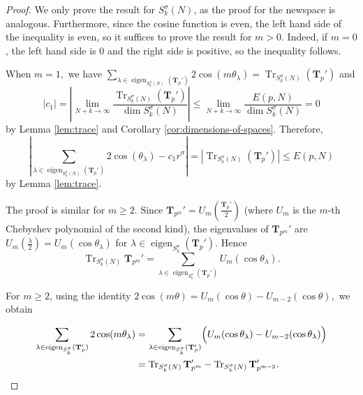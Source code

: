 \documentclass[11pt,letterpaper,reqno]{amsart}
\theoremstyle{definition}
\numberwithin{equation}{section}
\numberwithin{figure}{section}
\numberwithin{table}{section}
\newcommand{\eigen}{\operatorname{eigen}}
\begin{document}
\begin{proof}
    We only prove the result for $S_k^\sigma(N)$, as the proof for the newspace is analogous. Furthermore, since the cosine function is even, the left hand side of the inequality is even, so it suffices to prove the result for $m > 0$. Indeed, if $m = 0$, the left hand side is $0$ and the right side is positive, so the inequality follows.

    When $m = 1,$ we have $\sum_{\lambda \in \eigen_{S_k^\sigma(N)}(\mathbf{T}_p')} 2\cos(m\theta_\lambda) = \operatorname{Tr}_{S_k^\sigma(N)}(\mathbf{T}_p')$ and
    $$|c_1| = \left| \lim_{N + k \rightarrow \infty} \frac{\operatorname{Tr}_{S_k^\sigma(N)}(\mathbf{T}_p')}{\dim S_k^\sigma(N)}  \right| \leq \lim_{N + k \rightarrow \infty} \frac{E(p, N)}{\dim S_k^\sigma(N)} = 0$$
    by Lemma \ref{lem:trace} and Corollary \ref{cor:dimensions-of-spaces}. Therefore,
    $$\left| \sum_{\lambda \in \eigen_{S_k^\sigma(N)}(\mathbf{T}_p')} 2\cos(\theta_\lambda) - c_1 r^\sigma \right| = \left| \operatorname{Tr}_{S_k^\sigma(N)}(\mathbf{T}_p')  \right| \leq E(p, N)$$
    by Lemma \ref{lem:trace}.

    The proof is similar for $m \geq 2.$ Since \(\mathbf{T}_{p^m}' =  U_m\left(\frac{\mathbf{T}_p'}{2} \right)\) \cite[Theorem 10.2.9]{cohen2017modular} (where $U_m$ is the $m$-th Chebyshev polynomial of the second kind), 
the eigenvalues of $\mathbf{T}_{p^m}'$ are
\(
U_m\left( \frac{\lambda}{2}\right) = U_m(\cos\theta_\lambda)\) for \(\lambda \in 
\operatorname{eigen}_{S_k^{\sigma}}(\mathbf{T}_p')\).
Hence
\[
\operatorname{Tr}_{S_k^{\sigma}(N)} \mathbf{T}_{p^m}'
=
\sum_{\lambda \in \operatorname{eigen}_{S_k^{\sigma}}(\mathbf{T}_p')}
U_m(\cos\theta_\lambda).
\]

For $m \geq 2$, using the identity $2\cos(m\theta) = U_m(\cos\theta)-U_{m-2}(\cos\theta),$ we obtain

\begin{align*}
    \sum_{\lambda \in \operatorname{eigen}_{S_k^{\sigma}}(\mathbf{T}_p')} 2\cos(m\theta_\lambda)
&=
\sum_{\lambda \in \operatorname{eigen}_{S_k^{\sigma}}(\mathbf{T}_p')}
\Bigl(
U_m(\cos\theta_\lambda)
-
U_{m-2}(\cos\theta_\lambda)
\Bigr)\\ 
&= \operatorname{Tr}_{S_k^{\sigma}(N)} \mathbf{T}_{p^m}'
-
\operatorname{Tr}_{S_k^{\sigma}(N)} \mathbf{T}_{p^{m-2}}'.
\end{align*}


\end{proof}
\end{document}

